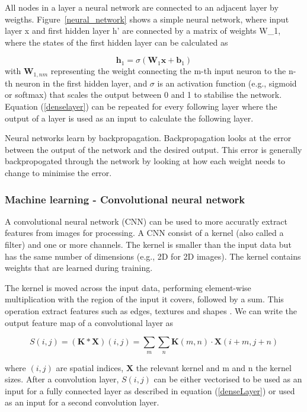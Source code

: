 \documentclass[9pt,Preprint]{lapreprint}
\begin{document}
All nodes in a layer a neural network are connected to an adjacent layer by weigths. Figure~\ref{neural_network} shows a simple neural network, where input layer x and first hidden layer h' are connected by a matrix of weights W\_1, where the states of the first hidden layer can be calculated as

\begin{equation}
\label{denseLayer}
\mathbf{h}_1 = \sigma(\mathbf{W}_1 \mathbf{x} + \mathbf{b}_1)
\end{equation}
with $\mathbf{W}_{1,nm}$ representing the weight connecting the m-th input neuron to the n-th neuron in the first hidden layer, and $\sigma$ is an activation function (e.g., sigmoid or softmax) that scales the output between 0 and 1 to stabilise the network. Equation (\ref{denselayer}) can be repeated for every following layer where the output of a layer is used as an input to calculate the following layer.

Neural networks learn by backpropagation. Backpropagation looks at the error between the output of the network and the desired output. This error is generally backpropogated through the network by looking at how each weight needs to change to minimise the error.

\subsubsection{Machine learning - Convolutional neural network}

A convolutional neural network (CNN) can be used to more accuratly extract features from images for processing. A CNN consist of a kernel (also called a filter) and one or more channels. The kernel is smaller than the input data but has the same number of dimensions (e.g., 2D for 2D images). The kernel contains weights that are learned during training.

The kernel is moved across the input data, performing element-wise multiplication with the region of the input it covers, followed by a sum. This operation extract features such as edges, textures and shapes \parencite{yamashita2018convolutional}. We can write the output feature map of a convolutional layer as

\begin{equation}
S(i, j) = (\mathbf{K} * \mathbf{X})(i, j) = \sum_m \sum_n \mathbf{K}(m, n) \cdot \mathbf{X}(i + m, j + n)
\end{equation}

where $(i,j)$ are spatial indices, $\mathbf{X}$ the relevant kernel and m and n the kernel sizes. After a convolution layer, $S(i, j)$ can be either vectorised to be used as an input for a fully connected layer as described in equation (\ref{denseLayer}) or used as an input for a second convolution layer.
\end{document}
